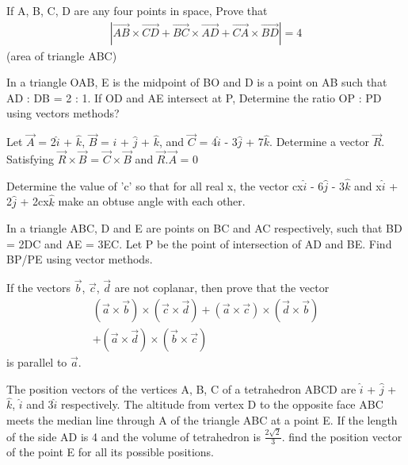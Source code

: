 \item If A, B, C, D are any four points in space, Prove that
\begin{align*}
|\overrightarrow{AB} \times \overrightarrow{CD} + \overrightarrow{BC} \times \overrightarrow{AD} + \overrightarrow{CA} \times \overrightarrow{BD}|=4
\end{align*}  
(area of triangle ABC)

\item In a triangle OAB, E is the midpoint of BO and D is a point on AB such that AD : DB = 2 : 1. If OD and AE intersect at P, Determine the ratio OP : PD using vectors methods?

\item Let $\overrightarrow{A}$ = 2$\hat{i}$ + $\hat{k}$, $\overrightarrow{B}$ = $\hat{i}$ + $\hat{j}$ + $\hat{k}$, and 
$\overrightarrow{C}$ = 4$\hat{i}$ - 3$\hat{j}$ + 7$\hat{k}$. Determine a vector $\overrightarrow{R}$. Satisfying 
$\overrightarrow{R} \times \overrightarrow{B}$ = $\overrightarrow{C} \times \overrightarrow{B}$ and $\overrightarrow{R}.\overrightarrow{A}$ = 0

\item Determine the value of 'c' so that for all real x, the vector cx$\hat{i}$ - 6$\hat{j}$ - 3$\hat{k}$ and 
x$\hat{i}$ + 2$\hat{j}$ + 2cx$\hat{k}$ make an obtuse angle with each other.

\item In a triangle ABC, D and E are points on BC and AC respectively, such that BD = 2DC and AE = 3EC. Let P be the point of intersection of AD and BE. Find BP/PE using vector methods.

\item If the vectors $\overrightarrow{b}$, $\overrightarrow{c}$, $\overrightarrow{d}$ are not coplanar, then prove that the vector
\begin{align*}
(\overrightarrow{a} \times \overrightarrow{b}) \times (\overrightarrow{c} \times \overrightarrow{d}) + (\overrightarrow{a} \times \overrightarrow{c}) \times (\overrightarrow{d} \times \overrightarrow{b})\\ + 
(\overrightarrow{a} \times \overrightarrow{d}) \times (\overrightarrow{b} \times \overrightarrow{c})
\end{align*}
is parallel to $\overrightarrow{a}$.

\item The position vectors of the vertices A, B, C of a tetrahedron ABCD are $\hat{i}$ + $\hat{j}$ + $\hat{k}$, $\hat{i}$ and 3$\hat{i}$ respectively. The altitude from vertex D to the opposite face ABC meets the median line through A of the triangle ABC at a point E. If the length of the side AD is 4 and the volume of tetrahedron is $\frac{2\sqrt{2}}{3}$. find the position vector of the point E for all its possible positions.

